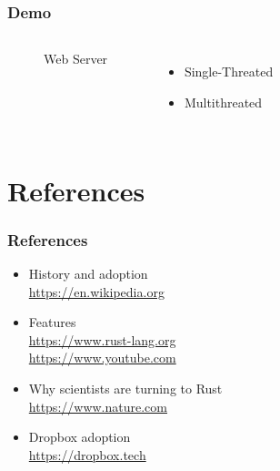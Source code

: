 \documentclass{beamer}
\begin{document}
\begin{frame}
\frametitle{Demo}

\begin{columns}[c] %

  \begin{figure}
    \centering
  \caption{Web Server}
  \end{figure}

\begin{itemize}
\item Single-Threated
\item Multithreated
\end{itemize}

\end{columns}

\end{frame}

\section{References}

\begin{frame}
\frametitle{References}
\begin{itemize}
\item History and adoption\\
\href{https://en.wikipedia.org/wiki/Rust_(programming_language)}{https://en.wikipedia.org}
\item Features\\
\href{https://www.rust-lang.org/}{https://www.rust-lang.org}\\
\href{https://www.youtube.com/watch?v=IDpe6k_IIfU}{https://www.youtube.com}
\item Why scientists are turning to Rust\\
\href{https://www.nature.com/articles/d41586-020-03382-2}{https://www.nature.com}
\item Dropbox adoption\\
\href{https://dropbox.tech/infrastructure/rewriting-the-heart-of-our-sync-engine}{https://dropbox.tech}
\end{itemize}
\end{frame}
\end{document}
